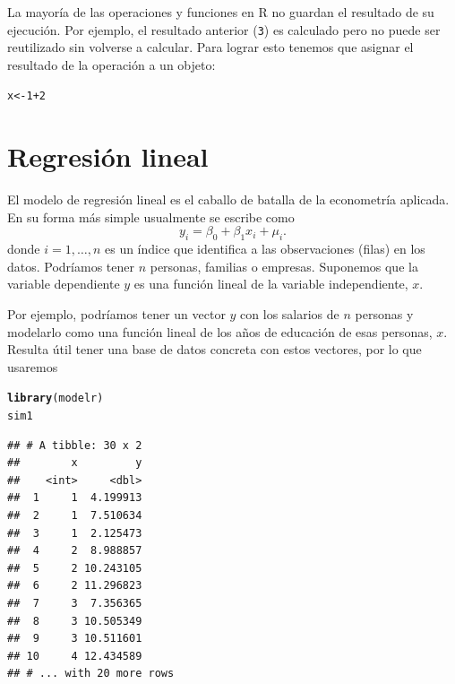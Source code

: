 \documentclass{article}\usepackage[]{graphicx}\usepackage[]{color}
\makeatletter
\newcommand{\hlnum}[1]{\textcolor[rgb]{0.686,0.059,0.569}{#1}}%
\newcommand{\hlopt}[1]{\textcolor[rgb]{0,0,0}{#1}}%
\newcommand{\hlstd}[1]{\textcolor[rgb]{0.345,0.345,0.345}{#1}}%
\newcommand{\hlkwb}[1]{\textcolor[rgb]{0.69,0.353,0.396}{#1}}%
\newcommand{\hlkwd}[1]{\textcolor[rgb]{0.737,0.353,0.396}{\textbf{#1}}}%
\newenvironment{kframe}{%
 \def\at@end@of@kframe{}%
 \ifinner\ifhmode%
  \def\at@end@of@kframe{\end{minipage}}%
  \begin{minipage}{\columnwidth}%
 \fi\fi%
 \def\FrameCommand##1{\hskip\@totalleftmargin \hskip-\fboxsep
 \colorbox{shadecolor}{##1}\hskip-\fboxsep
     \hskip-\linewidth \hskip-\@totalleftmargin \hskip\columnwidth}%
 \MakeFramed {\advance\hsize-\width
   \@totalleftmargin\z@ \linewidth\hsize
   \@setminipage}}%
 {\par\unskip\endMakeFramed%
 \at@end@of@kframe}
\newenvironment{knitrout}{}{} %
\makeatother
\begin{document}
La mayoría de las operaciones y funciones en R no guardan el resultado de su ejecución. Por ejemplo, el resultado anterior (\verb|3|) es calculado pero no puede ser reutilizado sin volverse a calcular. Para lograr esto tenemos que asignar el resultado de la operación a un objeto:
\begin{knitrout}
\color{fgcolor}\begin{kframe}
\begin{alltt}
\hlstd{x} \hlkwb{<-} \hlnum{1}\hlopt{+}\hlnum{2}
\end{alltt}
\end{kframe}
\end{knitrout}



\section{Regresión lineal}

El modelo de regresión lineal es el caballo de batalla de la econometría aplicada.
En su forma más simple usualmente se escribe como
\begin{equation}
y_i = \beta_0 + \beta_1 x_i + \mu_i.
\end{equation}
donde $i = 1, \ldots, n$ es un índice que identifica a las observaciones (filas) en los datos. Podríamos tener $n$ personas, familias o empresas. Suponemos que la variable dependiente $y$ es una función lineal de la variable independiente, $x$.

Por ejemplo, podríamos tener un vector $y$ con los salarios de $n$ personas y modelarlo como una función lineal de los años de educación de esas personas, $x$. Resulta útil tener una base de datos concreta con estos vectores, por lo que usaremos 

\begin{knitrout}
\color{fgcolor}\begin{kframe}
\begin{alltt}
\hlkwd{library}\hlstd{(modelr)}
\hlstd{sim1}
\end{alltt}
\begin{verbatim}
## # A tibble: 30 x 2
##        x         y
##    <int>     <dbl>
##  1     1  4.199913
##  2     1  7.510634
##  3     1  2.125473
##  4     2  8.988857
##  5     2 10.243105
##  6     2 11.296823
##  7     3  7.356365
##  8     3 10.505349
##  9     3 10.511601
## 10     4 12.434589
## # ... with 20 more rows
\end{verbatim}
\end{kframe}
\end{knitrout}
\end{document}
